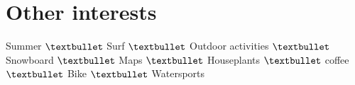 \documentclass[letterpaper]{twentysecondcv} %
\begin{document}
\section{Other interests}
\begin{center} Summer $\textbullet$ Surf $\textbullet$ Outdoor activities $\textbullet$ Snowboard $\textbullet$ Maps $\textbullet$ Houseplants $\textbullet$ coffee $\textbullet$ Bike $\textbullet$ Watersports\\ 
\vspace{2mm}
\faCoffee \hspace*{0.5cm} \faBeer \hspace*{0.5cm}\faSpotify \hspace*{0.5cm}\faSunO \hspace*{0.5cm}\faBicycle \hspace*{0.5cm}\faGraduationCap  \hspace*{0.5cm} \faMapMarker \hspace*{0.5cm}\faMap \hspace*{0.5cm}\faPlane \hspace*{0.5cm}\faRoad \hspace*{0.5cm}\faSignal \hspace*{0.5cm} \faLineChart  \hspace*{0.5cm}\faUniversity 
\end{center}

\end{document}
